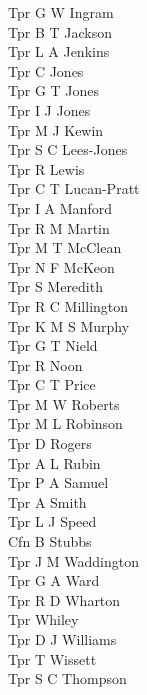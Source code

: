 \begin{multicols}{4}
  Tpr G W Ingram \\
  Tpr B T Jackson \\
  Tpr L A Jenkins \\
  Tpr C Jones \\
  Tpr G T Jones \\
  Tpr I J Jones \\
  Tpr M J Kewin \\
  Tpr S C Lees-Jones \\
  Tpr R Lewis \\
  Tpr C T Lucan-Pratt \\
  Tpr I A Manford \\
  Tpr R M Martin \\
  Tpr M T McClean \\
  Tpr N F McKeon \\
  Tpr S Meredith \\
  Tpr R C Millington \\
  Tpr K M S Murphy \\
  Tpr G T Nield \\
  Tpr R Noon \\
  Tpr C T Price \\
  Tpr M W Roberts \\
  Tpr M L Robinson \\
  Tpr D Rogers \\
  Tpr A L Rubin \\
  Tpr P A Samuel \\
  Tpr A Smith \\
  Tpr L J Speed \\
  Cfn B Stubbs \\
  Tpr J M Waddington \\
  Tpr G A Ward \\
  Tpr R D Wharton \\
  Tpr Whiley \\
  Tpr D J Williams \\
  Tpr T Wissett \\
  Tpr S C Thompson
\end{multicols}

\pagebreak
